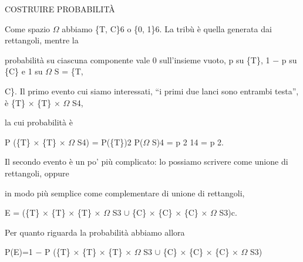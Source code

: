 \documentclass[a4paper,portrait,12pt]{article}
\begin{document}
\begin{flushleft}
COSTRUIRE PROBABILIT\`{A}
\end{flushleft}





\begin{flushleft}
Come spazio $\Omega$ abbiamo \{T, C\}6 o \{0, 1\}6. La tribù \`{e} quella generata dai rettangoli, mentre la
\end{flushleft}


\begin{flushleft}
probabilit\`{a} su ciascuna componente vale 0 sull'insieme vuoto, p su \{T\}, 1 $-$ p su \{C\} e 1 su $\Omega$ S = \{T,
\end{flushleft}


\begin{flushleft}
C\}. Il primo evento cui siamo interessati, ``i primi due lanci sono entrambi testa'', \`{e} \{T\} × \{T\} × $\Omega$ S4,
\end{flushleft}


\begin{flushleft}
la cui probabilit\`{a} \`{e}
\end{flushleft}


\begin{flushleft}
P (\{T\} × \{T\} × $\Omega$ S4) = P(\{T\})2 P($\Omega$ S)4 = p 2 14 = p 2.
\end{flushleft}


\begin{flushleft}
Il secondo evento \`{e} un po' più complicato: lo possiamo scrivere come unione di rettangoli, oppure
\end{flushleft}


\begin{flushleft}
in modo più semplice come complementare di unione di rettangoli,
\end{flushleft}


\begin{flushleft}
E = (\{T\} × \{T\} × \{T\} × $\Omega$ S3 $\cup$ \{C\} × \{C\} × \{C\} × $\Omega$ S3)c.
\end{flushleft}


\begin{flushleft}
Per quanto riguarda la probabilit\`{a} abbiamo allora
\end{flushleft}


\begin{flushleft}
P(E)=1 $-$ P (\{T\} × \{T\} × \{T\} × $\Omega$ S3 $\cup$ \{C\} × \{C\} × \{C\} × $\Omega$ S3)
\end{flushleft}
\end{document}
